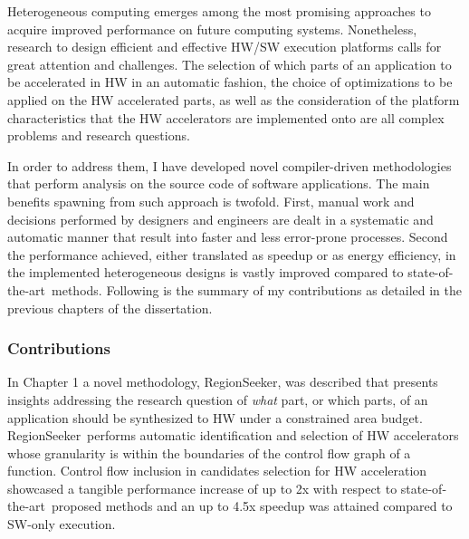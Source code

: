 \documentclass[]{usiinfthesis}
\newcommand{\rseeker}{{RegionSeeker}}
\newcommand{\SoTA}{{state-of-the-art}}
\begin{document}
Heterogeneous computing emerges among the most promising approaches to acquire improved performance on future 
computing systems. Nonetheless, research to design efficient and effective HW/SW execution platforms calls for great attention and challenges.
The selection of which parts of an application to be accelerated in HW in an automatic
fashion, the choice of optimizations to be applied on the HW accelerated parts, as well as the consideration of the 
platform characteristics that the HW accelerators are implemented onto are all complex problems and research questions.\par

In order to address them, I have developed novel compiler-driven methodologies that perform 
analysis on the source code of software applications. The main benefits spawning from such 
approach is twofold. First, manual work and decisions performed by designers and engineers are dealt in 
a systematic and automatic manner that result into faster and less error-prone processes.
Second the performance achieved, either translated as speedup or as energy 
efficiency, in the implemented heterogeneous designs is vastly improved compared to \SoTA\ methods.
Following is the summary of my contributions as detailed in the previous chapters of the dissertation.
\par

\subsubsection{Contributions}

In Chapter 1 a novel methodology, \rseeker, was described that presents insights addressing the 
research question of {\em what} part, or which parts, of an application should be synthesized to 
HW under a constrained area budget. \rseeker\ performs automatic identification and selection of 
HW accelerators whose granularity is within the boundaries of the control flow graph of a function.
Control flow inclusion in candidates selection for HW acceleration showcased a tangible performance 
increase of up to 2x with respect to \SoTA\ 
proposed methods and an up to 4.5x speedup was attained compared to SW-only execution.\par
\end{document}
